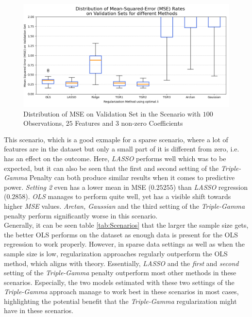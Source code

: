 \documentclass[12pt,a4paper]{article}
\begin{document}
\begin{figure}[h!]
\centering
\includegraphics[scale=0.55]{../02_simulation/021_simulation_figures/Scenarion_100_25_3.png}
\caption{Distribution of MSE on Validation Set in the Scenario with $100$ Observations, $25$ Features and $3$ non-zero Coefficients}
\label{fig:SpecificScenario}
\end{figure} 	

This scenario, which is a good exmaple for a sparse scenario, where a lot of features are in the dataset but only a small part of it is different from zero, i.e. has an effect on the outcome. Here, \textit{LASSO} performs well which was to be expected, but it can also be seen that the first and second setting of the \textit{Triple-Gamma} Penalty can both produce similar results when it comes to predictive power. \textit{Setting 2} even has a lower mean in MSE ($0.25255$) than \textit{LASSO} regression ($0.2858$). \textit{OLS} manages to perform quite well, yet has a visible shift towards higher \textit{MSE} values. \textit{Arctan, Gaussian} and the third setting of the \textit{Triple-Gamma} penalty perform significantly worse in this scenario.\\

Generally, it can be seen table \ref{tab:Scenarios} that the larger the sample size gets, the better OLS performs on the dataset as enough data is present for the OLS regression to work properly. However, in sparse data settings as well as when the sample size is low, regularization approaches regularly outperform the OLS method, which aligns with theory. Essentially, \textit{LASSO} and the \textit{first} and \textit{second} setting of the \textit{Triple-Gamma} penalty outperform most other methods in these scenarios. Especially, the two models estimated with these two settings of the \textit{Triple-Gamma} approach manage to work best in these scenarios in most cases, highlighting the potential benefit that the \textit{Triple-Gamma} regularization might have in these scenarios.\\
\end{document}
